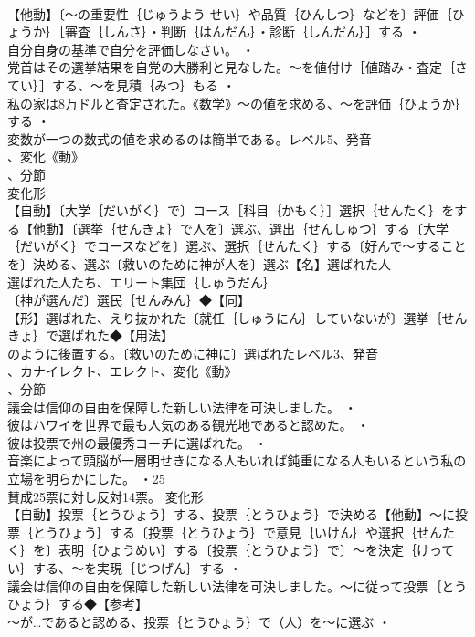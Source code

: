\documentclass[8pt]{extreport}
\begin{document}
\begin{CJK}{UTF8}{min}
\\	【他動】〔～の重要性｛じゅうよう せい｝や品質｛ひんしつ｝などを〕評価｛ひょうか｝［審査｛しんさ｝・判断｛はんだん｝・診断｛しんだん｝］する ・
\\	自分自身の基準で自分を評価しなさい。 ・
\\	党首はその選挙結果を自党の大勝利と見なした。～を値付け［値踏み・査定｛さてい｝］する、～を見積｛みつ｝もる ・
\\	私の家は8万ドルと査定された。《数学》～の値を求める、～を評価｛ひょうか｝する ・
\\	変数が一つの数式の値を求めるのは簡単である。レベル5、発音
\\	、変化《動》
\\	、分節
\\	変化形 
\\	【自動】〔大学｛だいがく｝で〕コース［科目｛かもく｝］選択｛せんたく｝をする【他動】〔選挙｛せんきょ｝で人を〕選ぶ、選出｛せんしゅつ｝する〔大学｛だいがく｝でコースなどを〕選ぶ、選択｛せんたく｝する〔好んで～することを〕決める、選ぶ〔救いのために神が人を〕選ぶ【名】選ばれた人
\\	選ばれた人たち、エリート集団｛しゅうだん｝
\\	〔神が選んだ〕選民｛せんみん｝◆【同】
\\	【形】選ばれた、えり抜かれた〔就任｛しゅうにん｝していないが〕選挙｛せんきょ｝で選ばれた◆【用法】
\\	のように後置する。〔救いのために神に〕選ばれたレベル3、発音
\\	、カナイレクト、エレクト、変化《動》
\\	、分節
\\	議会は信仰の自由を保障した新しい法律を可決しました。 ・
\\	彼はハワイを世界で最も人気のある観光地であると認めた。 ・
\\	彼は投票で州の最優秀コーチに選ばれた。 ・
\\	音楽によって頭脳が一層明せきになる人もいれば鈍重になる人もいるという私の立場を明らかにした。 ・25 
\\	賛成25票に対し反対14票。	変化形 
\\	【自動】投票｛とうひょう｝する、投票｛とうひょう｝で決める【他動】～に投票｛とうひょう｝する〔投票｛とうひょう｝で意見｛いけん｝や選択｛せんたく｝を〕表明｛ひょうめい｝する〔投票｛とうひょう｝で〕～を決定｛けってい｝する、～を実現｛じつげん｝する ・
\\	議会は信仰の自由を保障した新しい法律を可決しました。～に従って投票｛とうひょう｝する◆【参考】
\\	～が…であると認める、投票｛とうひょう｝で（人）を～に選ぶ ・

\end{CJK}
\end{document}
